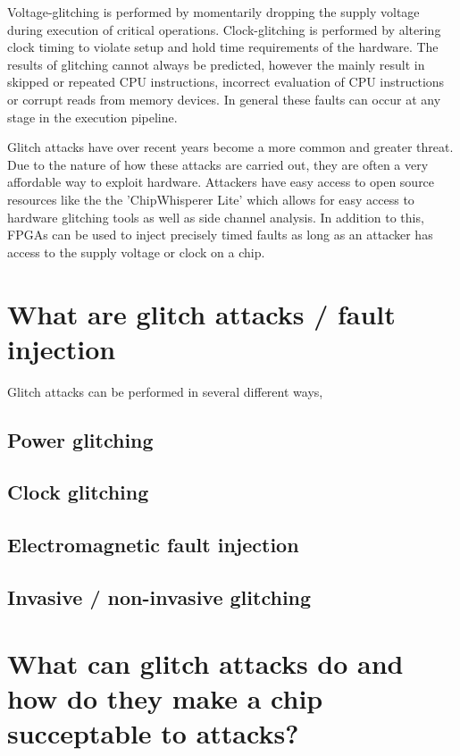Voltage-glitching is performed by momentarily dropping the supply voltage during execution of critical operations. Clock-glitching is performed by altering clock timing to violate setup and hold time requirements of the hardware\cite{intro_to_FI}. The results of glitching cannot always be predicted, however the mainly result in skipped or repeated CPU instructions, incorrect evaluation of CPU instructions or corrupt reads from memory devices\cite{intro_to_FI}. In general these faults can occur at any stage in the execution pipeline. 

Glitch attacks have over recent years become a more common and greater threat. Due to the nature of how these attacks are carried out, they are often a very affordable way to exploit hardware. Attackers have easy access to open source resources like the the 'ChipWhisperer Lite' which allows for easy access to hardware glitching tools as well as side channel analysis\cite{chipWhisperer}. In addition to this, FPGAs can be used to inject precisely timed faults as long as an attacker has access to the supply voltage or clock on a chip\cite{hole_in_soc}. 

\section{What are glitch attacks / fault injection}
\label{sec:glitch}

Glitch attacks can be performed in several different ways, 

\subsection{Power glitching}

\subsection{Clock glitching}

\subsection{Electromagnetic fault injection}

\subsection{Invasive / non-invasive glitching}

\section{What can glitch attacks do and how do they make a chip succeptable to attacks?}

